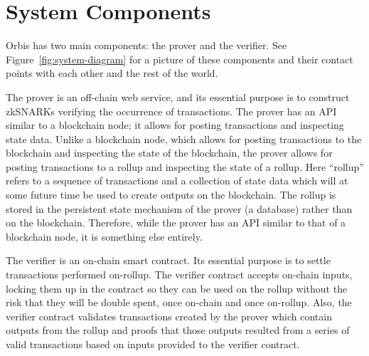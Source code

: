 \documentclass[12pt]{article}
\begin{document}
\section{System Components}

Orbis has two main components: the prover and the verifier. See Figure~\ref{fig:system-diagram} for a picture of these components and their contact points with each other and the rest of the world.

The prover is an off-chain web service, and its essential purpose is to construct zkSNARKs verifying the occurrence of transactions. The prover has an API similar to a blockchain node; it allows for posting transactions and inspecting state data. Unlike a blockchain node, which allows for posting transactions to the blockchain and inspecting the state of the blockchain, the prover allows for posting transactions to a rollup and inspecting the state of a rollup. Here ``rollup'' refers to a sequence of transactions and a collection of state data which will at some future time be used to create outputs on the blockchain. The rollup is stored in the persistent state mechanism of the prover (a database) rather than on the blockchain. Therefore, while the prover has an API similar to that of a blockchain node, it is something else entirely.

The verifier is an on-chain smart contract. Its essential purpose is to settle transactions performed on-rollup. The verifier contract accepts on-chain inputs, locking them up in the contract so they can be used on the rollup without the risk that they will be double spent, once on-chain and once on-rollup. Also, the verifier contract validates transactions created by the prover which contain outputs from the rollup and proofs that those outputs resulted from a series of valid transactions based on inputs provided to the verifier contract.
\end{document}
